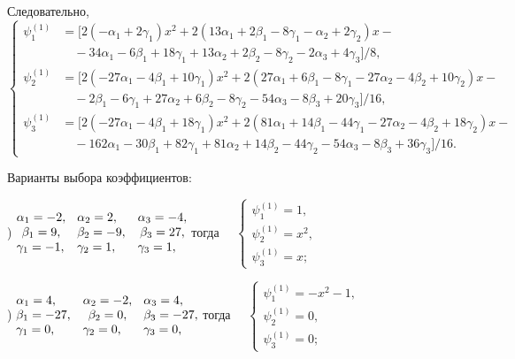 \documentclass[11pt]{article}
\begin{document}
{Следовательно,
\[
\left\{
\begin{aligned}
\psi_1^{(1)} &= \big[2(- \alpha_1 + 2\gamma_1)x^2 + 2(13\alpha_1 + 2\beta_1 -8\gamma_1 - \alpha_2 + 2\gamma_2)x - \\
&\quad -34\alpha_1 - 6\beta_1 + 18\gamma_1 + 13\alpha_2 + 2\beta_2 - 8\gamma_2 - 2\alpha_3 + 4\gamma_3\big]/8, \\
\psi_2^{(1)} &= \big[2( - 27\alpha_1 - 4\beta_1 + 10\gamma_1)x^2 + 2(27\alpha_1 + 6\beta_1 - 8\gamma_1 - 27\alpha_2 - 4\beta_2 + 10\gamma_2)x - \\
&\quad - 2\beta_1 - 6\gamma_1 + 27\alpha_2 + 6\beta_2 - 8\gamma_2 - 54\alpha_3 - 8\beta_3 + 20\gamma_3\big]/16, \\
\psi_3^{(1)} &= \big[2( - 27\alpha_1 - 4\beta_1 + 18\gamma_1)x^2 + 2(81\alpha_1 + 14\beta_1 - 44\gamma_1 -27\alpha_2 - 4\beta_2 + 18\gamma_2)x - \\
&\quad -162\alpha_1 - 30\beta_1 + 82\gamma_1 + 81\alpha_2 + 14\beta_2 - 44\gamma_2 -54\alpha_3 - 8\beta_3 + 36\gamma_3\big]/16.
\end{aligned}
\right.
\]

Варианты выбора коэффициентов:

) $\begin{matrix} \alpha_1 = -2,\hfill\\ \beta_1 = 9,\\ \gamma_1 = -1,\hfill \end{matrix}$ \
$\begin{matrix} \alpha_2 = 2,\hfill\\ \beta_2 = -9,\\ \gamma_2 = 1,\hfill \end{matrix}$ \
$\begin{matrix} \alpha_3 = -4,\hfill\\ \beta_3 = 27,\\ \gamma_3 = 1,\hfill \end{matrix}$
тогда \ \ $\begin{cases} 
\psi_1^{(1)} = 1, \\
\psi_2^{(1)} = x^2, \\
\psi_3^{(1)} = x;
\end{cases}$

) $\begin{matrix} \alpha_1 = 4,\hfill\\ \beta_1 = -27,\\ \gamma_1 = 0,\hfill \end{matrix}$ \
$\begin{matrix} \alpha_2 = -2,\hfill\\ \beta_2 = 0,\\ \gamma_2 = 0,\hfill \end{matrix}$ \
$\begin{matrix} \alpha_3 = 4,\hfill\\ \beta_3 = -27,\\ \gamma_3 = 0,\hfill \end{matrix}$
тогда \ \ $\begin{cases} 
\psi_1^{(1)} = -x^2 -1, \\
\psi_2^{(1)} = 0, \\
\psi_3^{(1)} = 0;
\end{cases}$

}
\end{document}
